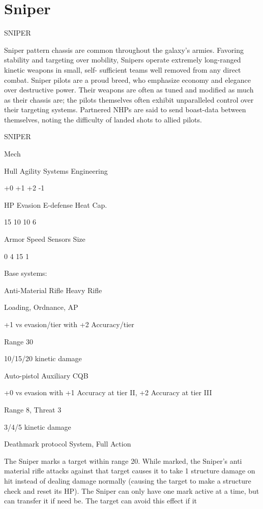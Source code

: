 \section{Sniper}

                                                 SNIPER

Sniper pattern chassis are common throughout the galaxy’s armies. Favoring stability and
targeting over mobility, Snipers operate extremely long-ranged kinetic weapons in small, self-
sufficient teams well removed from any direct combat. Sniper pilots are a proud breed, who
emphasize economy and elegance over destructive power. Their weapons are often as tuned and
modified as much as their chassis are; the pilots themselves often exhibit unparalleled control
over their targeting systems. Partnered NHPs are said to send boast-data between themselves,
noting the difficulty of landed shots to allied pilots.


 SNIPER

 Mech

 Hull       Agility      Systems       Engineering

 +0         +1           +2            -1

 HP         Evasion      E-defense     Heat Cap.

 15         10           10            6

 Armor      Speed        Sensors       Size

 0          4            15            1

Base systems:

Anti-Material Rifle
Heavy Rifle

Loading, Ordnance, AP

+1 vs evasion/tier with +2 Accuracy/tier

Range 30

10/15/20 kinetic damage


Auto-pistol
Auxiliary CQB

+0 vs evasion with +1 Accuracy at tier II, +2 Accuracy at tier III

Range 8, Threat 3

3/4/5 kinetic damage


Deathmark protocol
System, Full Action

The Sniper marks a target within range 20. While marked, the Sniper’s anti material rifle attacks
against that target causes it to take 1 structure damage on hit instead of dealing damage
normally (causing the target to make a structure check and reset its HP). The Sniper can only
have one mark active at a time, but can transfer it if need be. The target can avoid this effect if it




